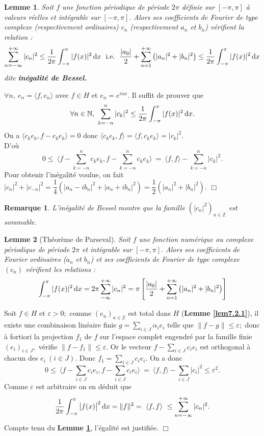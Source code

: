 \documentclass[11pt, a4paper]{book}
\newtheorem{rem}{Remarque}[section]
\newtheorem{lem}{Lemme}[section]
\newenvironment{pr}{\noindent {\bf Preuve} \noindent} {\hfill $\Box$\vskip 5mm}
\begin{document}
\begin{lem}\label{lem7.3.2} Soit $f$ une fonction p\'eriodique de p\'eriode $2\pi$ d\'efinie sur $[-\pi,\pi]$ \`a valeurs r\'eelles et int\'egrable sur $[-\pi,\pi].$ Alors ses coefficients de Fourier de type complexe (respectivement ordinaires) $c_n$ (respectivement $a_n$ et $b_n$) v\'erifient la relation : $$\sum_{n=-\infty}^{+\infty}|c_n|^2\leq \dfrac{1}{2\pi}\int_{-\pi}^\pi |f(x)|^2\,\mathrm{d} x ~~\text{i.e.}~~\dfrac{|a_0|}{2}+\sum_{n=1}^{+\infty}\left(|a_n|^2+|b_n|^2\right)\leq \dfrac{1}{2\pi}\int_{-\pi}^\pi |f(x)|^2\,\mathrm{d} x$$ dite \textbf{in\'egalit\'e de Bessel.}
\end{lem}
\begin{pr} \quad
$\forall n,~e_n=\langle f,e_n\rangle$ avec $f\in H$ et $e_n=e^{inx}$. Il suffit de prouver que $$\forall n\in \mathbb{N},~{\displaystyle \sum_{k=-n}^n|c_k|^2\leq\dfrac{1}{2\pi}\int_{-\pi}^\pi |f(x)|^2\,\mathrm{d} x}.$$ 
On a $\langle c_ke_k,f-c_ke_k\rangle=0$ donc $\langle c_ke_k,f\rangle=\langle f,c_ke_k\rangle=|c_k|^2.$ \\
D'o\`u $${\displaystyle 0\leq~\langle f-\sum_{k=-n}^nc_ke_k,f-\sum_{k=-n}^nc_ke_k\rangle~=~\langle f,f\rangle-\sum_{k=-n}^n|c_k|^2.}$$
Pour obtenir l'in\'egalit\'e voulue, on fait $|c_n|^2+|c_{-n}|^2=\dfrac{1}{4}(|a_n-ib_n|^2+|a_n+ib_n|^2)=\dfrac{1}{2}(|a_n|^2+|b_n|^2).$
\end{pr}
\begin{rem} L'in\'egalit\'e de Bessel montre que la famille $(|c_n|^2)_{n\in\mathbb{Z}}$ est sommable.
\end{rem}
\begin{lem}[Th\'eor\`eme de Parseval]
Soit $f$ une fonction num\'erique ou complexe p\'eriodique de p\'eriode $2\pi$ et int\'egrable sur $[-\pi,\pi].$ Alors ses coefficients de Fourier ordinaires ($a_n$ et $b_n$) et ses coefficients de Fourier de type complexe $(c_n)$ v\'erifient les relations : $$\int_{-\pi}^\pi |f(x)|^2\,\mathrm{d} x=2\pi\sum_{-\infty}^{+\infty}|c_n|^2=\pi\left[\dfrac{|a_0|}{2}+\sum_{n=1}^{+\infty}\left(|a_n|^2+|b_n|^2\right)\right]$$
\end{lem}
\begin{pr}\quad
Soit $f\in H$ et $\varepsilon >0;$ comme $(e_n)_{n\in\mathbb{Z}}$ est total dans $H$ (\textbf{Lemme \ref{lem7.2.1}}), 
il existe une combinaison lin\'eaire finie $g={\displaystyle \sum_{i\in J}\alpha_i e_i}$ telle que
 $\|f-g\|\leq\varepsilon;$ donc \`a fortiori la projection $f_1$ de $f$ sur l'espace complet engendr\'e par la famille finie $(e_i)_{i\in J},$ 
v\'erifie $\|f-f_1\|\leq \varepsilon.$ Or le vecteur $f-{\displaystyle \sum_{i\in J}c_ie_i}$ est orthogonal \`a chacun des $e_i~(i\in J)$.
 Donc $f_1={\displaystyle \sum_{i\in J}c_ie_i}$. On a donc $$0\leq ~\langle f-\sum_{i\in J}c_ie_i,f-\sum_{i\in J}c_ie_i\rangle~=~\langle f,f\rangle-\sum_{i\in J}|c_i|^2\leq \varepsilon^2.$$ 
 Comme $\varepsilon$ est arbitraire on en d\'eduit que $$\dfrac{1}{2\pi}\int_{-\pi}^\pi \big|f(x)\big|^2\,\mathrm{d} x=\|f\|^2=~\langle f,f\rangle~\leq \sum_{n=-\infty}^{+\infty}|c_n|^2.$$ Compte tenu du \textbf{Lemme \ref{lem7.3.2}}, l'\'egalit\'e est justifi\'ee.
 \end{pr}
\end{document}
